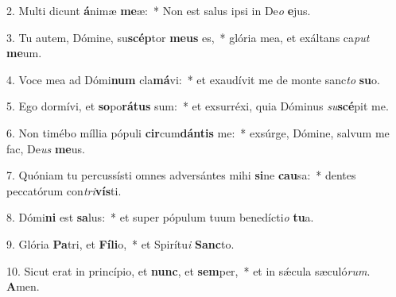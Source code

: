 2. Multi dicunt \textbf{á}nimæ \textbf{me}æ:~*  Non est salus ipsi in De\textit{o} \textbf{e}jus.\

3. Tu autem, Dómine, su\textbf{scép}tor \textbf{me}\textbf{us} es,~*  glória mea, et exáltans ca\textit{put} \textbf{me}um.\

4. Voce mea ad Dómi\textbf{num} cla\textbf{má}vi:~*  et exaudívit me de monte sanc\textit{to} \textbf{su}o.\

5. Ego dormívi, et \textbf{so}po\textbf{rá}\textbf{tus} sum:~*  et exsurréxi, quia Dóminus \textit{su}\textbf{scé}pit me.\

6. Non timébo míllia pópuli \textbf{cir}cum\textbf{dán}\textbf{tis} me:~*  exsúrge, Dómine, salvum me fac, De\textit{us} \textbf{me}us.\

7. Quóniam tu percussísti omnes adversántes mihi \textbf{si}ne \textbf{cau}sa:~*  dentes peccatórum con\textit{tri}\textbf{vís}ti.\

8. Dómi\textbf{ni} est \textbf{sa}lus:~*  et super pópulum tuum benedícti\textit{o} \textbf{tu}a.\

9. Glória \textbf{Pa}tri, et \textbf{Fí}\textbf{li}o,~*  et Spirítu\textit{i} \textbf{Sanc}to.\

10. Sicut erat in princípio, et \textbf{nunc}, et \textbf{sem}per,~*  et in sǽcula sæculó\textit{rum}. \textbf{A}men.\

